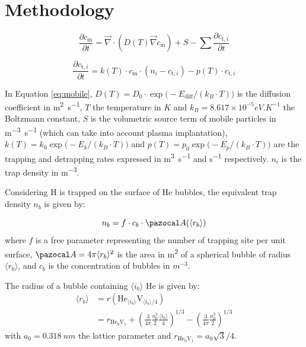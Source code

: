 \section{Methodology}

\begin{equation}
    \frac{\partial c_\mathrm{m}}{\partial t}=\vec{\nabla} \cdot\left(D(T) \vec{\nabla}c_\mathrm{m}\right)+S-\sum \frac{\partial c_{\mathrm{t}, i}}{\partial t}
    \label{eq:mobile}
\end{equation}

\begin{equation}
    \frac{\partial c_{\mathrm{t}, i}}{\partial t}=k(T) \cdot c_\mathrm{m} \cdot\left(n_{i}-c_{\mathrm{t}, i}\right)-p(T) \cdot c_{\mathrm{t}, i}
    \label{eq:trapped}
\end{equation}

In Equation \ref{eq:mobile}, ${D(T)=D_0 \cdot \exp\big(-E_\mathrm{diff}/ (k_B \cdot T )\big)}$ is the diffusion coefficient in \si{m^2.s^{-1}}, $T$ the temperature in $\si{K}$ and ${k_B = 8.617 \times 10^{-5} \si{eV.K^{-1}}}$ the Boltzmann constant, $S$ is the volumetric source term of mobile particles in \si{m^{-3}.s^{-1}} (which can take into account plasma implantation), $k(T)=k_0\exp{\big(-E_{k} / (k_B \cdot T ) \big)}$ and $p(T)=p_0\exp{\big(-E_{p}/ (k_B \cdot T )\big)}$ are the trapping and detrapping rates expressed in \si{m^3.s^{-1}} and \si{s^{-1}} respectively.
$n_i$ is the trap density in \si{m^{-3}}.

Considering H is trapped on the surface of He bubbles, the equivalent trap density $n_b$ is given by:

\begin{equation}
    n_b = f \cdot c_b \cdot \Ab(\langle r_b \rangle)
\end{equation}
where $f$ is a free parameter representing the number of trapping site per unit surface, $\Ab = 4\pi \langle r_b \rangle^2$ is the area in \si{m^2} of a spherical bubble of radius $\langle r_b \rangle$, and $c_b$ is the concentration of bubbles in $\si{m^{-3}}$.


The radius of a bubble containing $\langle i_b \rangle$ He is given by:
\begin{equation}
    \begin{split}
        \langle r_b \rangle &= r(\mathrm{He}_{\langle i_b \rangle}\mathrm{V}_{\langle i_b \rangle/4}) \\
        &= r_{\mathrm{He}_0 \mathrm{V}_1} + \left(\frac{3}{4 \pi} \frac{a_0^3}{2} \frac{\langle i_b \rangle}{4} \right)^{1/3} - \left(\frac{3}{4 \pi} \frac{a_0^3}{2} \right)^{1/3}
    \end{split}
    \label{eq: radius average}
\end{equation}
with $a_0 = \SI{0.318}{nm}$ the lattice parameter and $r_{\mathrm{He}_0 \mathrm{V}_1} =  a_0 \sqrt{3}/4$.



